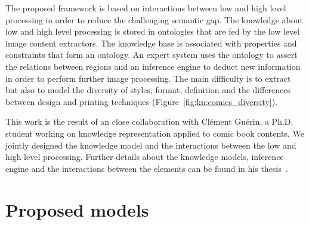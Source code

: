 The proposed framework is based on interactions between low and high level processing in order to reduce the challenging semantic gap.
The knowledge about low and high level processing is stored in ontologies that are fed by the low level image content extractors.
The knowledge base is associated with properties and constraints that form an ontology.
An expert system uses the ontology to assert the relations between regions and an inference engine to deduct new information in order to perform further image processing.
The main difficulty is to extract but also to model the diversity of styles, format, definition and the differences between design and printing techniques (Figure~\ref{fig:kn:comics_diversity}).





This work is the result of an close collaboration with Cl{\'e}ment Gu{\'e}rin, a Ph.D. student working on knowledge representation applied to comic book contents.
We jointly designed the knowledge model and the interactions between the low and high level processing.
Further details about the knowledge models, inference engine and the interactions between the elements can be found in his thesis~\cite{phdthesisGuerin14}.

\section{Proposed models} %
\label{sec:kn:proposed_models}

